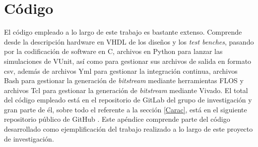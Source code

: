 
\chapter{Código} %

\label{Codigo} %

El código empleado a lo largo de este trabajo es bastante extenso.
Comprende desde la descripción hardware en VHDL de los diseños y los \textit{test benches}, pasando por la codificación de software en C, archivos en Python para lanzar las simulaciones de VUnit, así como para gestionar sus archivos de salida en formato csv, además de archivos Yml para gestionar la integración continua, archivos Bash para gestionar la generación de \textit{bitstream} mediante herramientas FLOS y archivos Tcl para gestionar la generación de \textit{bitstream} mediante Vivado. 
El total del código empleado está en el repositorio de GitLab del grupo de investigación y gran parte de él, sobre todo el referente a la sección \ref{Carac}, está en el siguiente repositorio público de GitHub \cite{gh:practices}.
Este apéndice comprende parte del código desarrollado como ejemplificación del trabajo realizado a lo largo de este proyecto de investigación.



